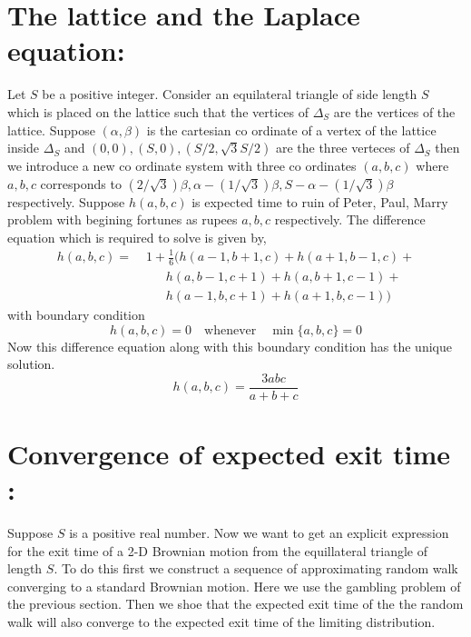 \documentclass[11pt, a4paper, oneside]{report}
\numberwithin{equation}{section}
\begin{document}
\section{The lattice and the Laplace equation: }Let $S$ be a positive integer. Consider an equilateral triangle of side length $S$ which is placed on the lattice such that the vertices of $\Delta_S$ are the vertices of the lattice.
Suppose $(\alpha,\beta)$ is the cartesian co ordinate of a vertex of the lattice inside $\Delta_S$ and $(0,0),(S,0),(S/2,\sqrt{3}S/2)$ are the three verteces of $\Delta_S$ then we introduce a new co ordinate system with three co ordinates $(a,b,c)$ where $a,b,c$ corresponds to $(2/\sqrt{3})\beta, \alpha - (1/\sqrt{3}) \beta, S - \alpha - (1/\sqrt{3}) \beta$ respectively. Suppose $h(a,b,c)$ is expected time to ruin of Peter, Paul, Marry problem with begining fortunes as rupees $a,b,c$ respectively. The difference equation which is required to solve is given by,\cite{research}
\begin{align*}
h(a, b, c) =\; &1 + \frac{1}{6} \big( 
    h(a - 1, b + 1, c) + 
    h(a + 1, b - 1, c) + \\
    &\quad\;\; h(a, b - 1, c + 1) + 
    h(a, b + 1, c - 1) + \\
    &\quad\;\; h(a - 1, b, c + 1) + 
    h(a + 1, b, c - 1)
\big)
\end{align*}
with boundary condition 
\[
h(a, b, c) = 0 \quad \text{whenever} \quad \min\{a, b, c\} = 0
\]
Now this difference equation along with this boundary condition has the unique solution.\cite{research}
\[
h(a, b, c) = \frac{3abc}{a + b + c}
\]
\section{Convergence of expected exit time : }
Suppose \(S\) is a positive real number. Now we want to get an explicit expression for the exit time of a 2-D Brownian motion from the equillateral triangle of length \(S\). To do this first we construct a sequence of approximating random walk converging to a standard Brownian motion. Here we use the gambling problem of the previous section. Then we shoe that the expected exit time of the the random walk will also converge to the expected exit time of the limiting distribution.
\end{document}
